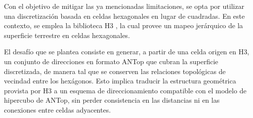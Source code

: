 Con el objetivo de mitigar las ya mencionadas limitaciones, se opta por utilizar una discretización basada en celdas hexagonales en lugar de cuadradas. En este contexto, se emplea la biblioteca H3 \cite{h3geo_docs}, la cual provee un mapeo jerárquico de la superficie terrestre en celdas hexagonales.

El desafío que se plantea consiste en generar, a partir de una celda origen en H3, un conjunto de direcciones en formato ANTop que cubran la superficie discretizada, de manera tal que se conserven las relaciones topológicas de vecindad entre los hexágonos. Esto implica traducir la estructura geométrica provista por H3 a un esquema de direccionamiento compatible con el modelo de hipercubo de ANTop, sin perder consistencia en las distancias ni en las conexiones entre celdas adyacentes.
